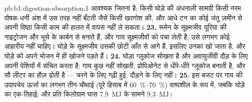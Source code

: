 \begin{solution}{pb:b1:digestion-absorption:1}
आवश्यक  जितना है; किसी घोड़े की अंधनाली सामग्री किसी नरम
पोषक-धनी अंश में उस तरह नहीं बँटती जैसे किसी खरगोश की, और आधे टन का कोई
जंतु ज़मीन से अपनी विष्ठा किसी काम की हालत में वापस नहीं ले सकता।
\textbf{23.} रूमेन के सूक्ष्मजीव यूरिया की नाइट्रोजन और भूसे के कार्बन
से  बनाते हैं, और गाय सूक्ष्मजीवों को पचा लेती है: उसे लगभग कोई
आहारीय  नहीं चाहिए। घोड़े के सूक्ष्मजीव उसकी छोटी आँत से आगे हैं,
इसलिए उनका  खो जाता है, और घोड़े को अपने  भोजन में ही
खोजने पड़ते हैं।
\textbf{24.} घोड़ा ग्लूकोज सोखता है और अवायुजीवी दौड़ के लिए अपनी
पेशियों में  संचित करता है; गाय कुछ नहीं सोखती, प्रोपिओनेट से
धीरे-धीरे ग्लूकोज बनाती है, और सौ लीटर का हौज़ ढोती है --- चरने के लिए
गढ़ी हुई, दौड़ने के लिए नहीं।
\textbf{25.} इस बजट पर गाय की उपापचेय ऊर्जा का लगभग तीन-चौथाई
(पूरे हिसाब में \qtyrange{60}{70}{\%}) वाष्पशील
 के रूप में, जबकि घोड़े का एक-तिहाई; और प्रति किलोग्राम घास
\qty{7.9}{MJ} के सामने \qty{9.3}{MJ}।
\end{solution}
